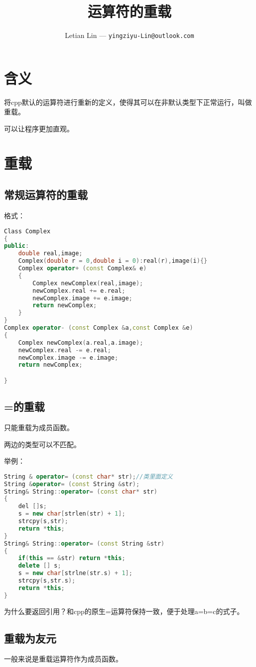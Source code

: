 \documentclass[UTF8]{ctexart}
\title{
	运算符的重载
}
\author{
	Letian Lin --- \texttt{yingziyu-Lin@outlook.com}
}
\begin{document}
\maketitle
\section{含义}
将cpp默认的运算符进行重新的定义，使得其可以在非默认类型下正常运行，叫做重载。

可以让程序更加直观。

\section{重载}
\subsection{常规运算符的重载}
格式：
\begin{lstlisting}[language=C++]
Class Complex
{
public:
	double real,image;
	Complex(double r = 0,double i = 0):real(r),image(i){}
	Complex operator+ (const Complex& e)
	{
		Complex newComplex(real,image);
		newComplex.real += e.real;
		newComplex.image += e.image;
		return newComplex;
	}
}
Complex operator- (const Complex &a,const Complex &e)
{
	Complex newComplex(a.real,a.image);
	newComplex.real -= e.real;
	newComplex.image -= e.image;
	return newComplex;

}
\end{lstlisting}
\subsection{=的重载}
只能重载为成员函数。

两边的类型可以不匹配。

举例：
\begin{lstlisting}[language=C++]
String & operator= (const char* str);//类里面定义
String &operator= (const String &str);
String& String::operator= (const char* str)
{
	del []s;
	s = new char[strlen(str) + 1];
	strcpy(s,str);
	return *this;
}
String& String::operator= (const String &str)
{
	if(this == &str) return *this;
	delete [] s;
	s = new char[strlne(str.s) + 1];
	strcpy(s,str.s);
	return *this;
}
\end{lstlisting}

为什么要返回引用？和cpp的原生=运算符保持一致，便于处理a=b=c的式子。

\subsection{重载为友元}
一般来说是重载运算符作为成员函数。
\end{document}
